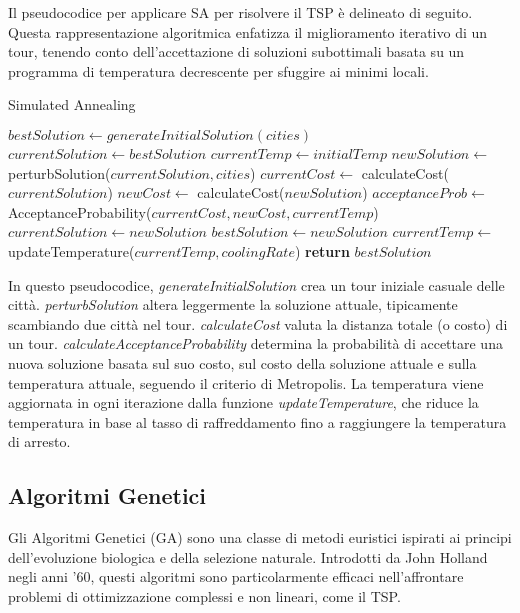 Il pseudocodice per applicare \Gls{SA} per risolvere il \Gls{TSP} è delineato di seguito. Questa rappresentazione algoritmica enfatizza il miglioramento iterativo di un tour, tenendo conto dell'accettazione di soluzioni subottimali basata su un programma di temperatura decrescente per sfuggire ai minimi locali.

\begin{algorithm}
	\caption{Simulated Annealing}\label{alg:detailedsimulatedannealing}
	\begin{algorithmic}[1]
		\State $bestSolution \gets generateInitialSolution(cities)$
		\State $currentSolution \gets bestSolution$
		\State $currentTemp \gets initialTemp$
		\State $newSolution \gets$ perturbSolution($currentSolution, cities$)
		\State $currentCost \gets$ calculateCost($currentSolution$)
		\State $newCost \gets$ calculateCost($newSolution$)
		\State $acceptanceProb \gets$ AcceptanceProbability($currentCost, newCost, currentTemp$)
		\State $currentSolution \gets newSolution$
		\State $bestSolution \gets newSolution$
		\EndIf
		\EndIf
		\State $currentTemp \gets$ updateTemperature($currentTemp, coolingRate$)
		\EndWhile
		\State \textbf{return} $bestSolution$
		\EndProcedure
	\end{algorithmic}
\end{algorithm}

In questo pseudocodice, \emph{generateInitialSolution} crea un tour iniziale casuale delle città. \emph{perturbSolution} altera leggermente la soluzione attuale, tipicamente scambiando due città nel tour. \emph{calculateCost} valuta la distanza totale (o costo) di un tour. \emph{calculateAcceptanceProbability} determina la probabilità di accettare una nuova soluzione basata sul suo costo, sul costo della soluzione attuale e sulla temperatura attuale, seguendo il criterio di Metropolis\cite{metropolis1953equation}. La temperatura viene aggiornata in ogni iterazione dalla funzione \emph{updateTemperature}, che riduce la temperatura in base al tasso di raffreddamento fino a raggiungere la temperatura di arresto.

\subsection{Algoritmi Genetici}

Gli Algoritmi Genetici (\Gls{GA}) sono una classe di metodi euristici ispirati ai principi dell'evoluzione biologica e della selezione naturale. Introdotti da John Holland negli anni '60, questi algoritmi sono particolarmente efficaci nell'affrontare problemi di ottimizzazione complessi e non lineari, come il \Gls{TSP}.

